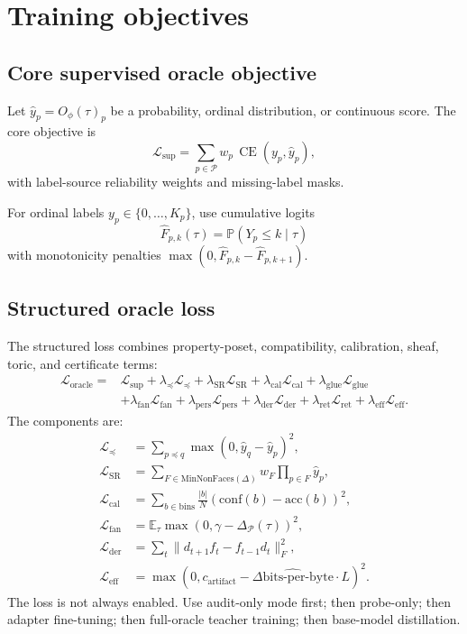 \documentclass[11pt]{article}
\newcommand{\calP}{\mathcal{P}}
\newcommand{\CE}{\operatorname{CE}}
\newcommand{\bitsperbyte}{\mathrm{bits\mbox{-}per\mbox{-}byte}}
\newcommand{\loss}{\mathcal{L}}
\numberwithin{equation}{section}
\begin{document}
\section{Training objectives}
\subsection{Core supervised oracle objective}
Let $\hat y_p=O_\phi(\tau)_p$ be a probability, ordinal distribution, or continuous score. The core objective is
\begin{equation}
\loss_{\mathrm{sup}}=\sum_{p\in\calP}w_p\,\CE(y_p,\hat y_p),
\end{equation}
with label-source reliability weights and missing-label masks.

For ordinal labels $y_p\in\{0,\ldots,K_p\}$, use cumulative logits
\begin{equation}
\hat F_{p,k}(\tau)=\mathbb{P}(Y_p\le k\mid\tau)
\end{equation}
with monotonicity penalties $\max(0,\hat F_{p,k}-\hat F_{p,k+1})$.

\subsection{Structured oracle loss}
The structured loss combines property-poset, compatibility, calibration, sheaf, toric, and certificate terms:
\begin{align}
\loss_{\mathrm{oracle}}={}&\loss_{\mathrm{sup}}+\lambda_{\preceq}\loss_{\preceq}+\lambda_{\mathrm{SR}}\loss_{\mathrm{SR}}+\lambda_{\mathrm{cal}}\loss_{\mathrm{cal}}+\lambda_{\mathrm{glue}}\loss_{\mathrm{glue}}\\
&+\lambda_{\mathrm{fan}}\loss_{\mathrm{fan}}+\lambda_{\mathrm{pers}}\loss_{\mathrm{pers}}+\lambda_{\mathrm{der}}\loss_{\mathrm{der}}+\lambda_{\mathrm{ret}}\loss_{\mathrm{ret}}+\lambda_{\mathrm{eff}}\loss_{\mathrm{eff}}.
\end{align}
The components are:
\begin{align}
\loss_{\preceq}&=\sum_{p\preceq q}\max(0,\hat y_q-\hat y_p)^2,\\
\loss_{\mathrm{SR}}&=\sum_{F\in\mathrm{MinNonFaces}(\Delta)}w_F\prod_{p\in F}\hat y_p,\\
\loss_{\mathrm{cal}}&=\sum_{b\in\mathrm{bins}}\frac{|b|}{N}\left(\mathrm{conf}(b)-\mathrm{acc}(b)\right)^2,\\
\loss_{\mathrm{fan}}&=\mathbb{E}_\tau\max(0,\gamma-\Delta_{\calP}(\tau))^2,\\
\loss_{\mathrm{der}}&=\sum_t\|d_{t+1}f_t-f_{t-1}d_t\|_F^2,\\
\loss_{\mathrm{eff}}&=\max(0, c_{\mathrm{artifact}}-\widehat{\Delta \bitsperbyte}\cdot L)^2.
\end{align}
The loss is not always enabled. Use audit-only mode first; then probe-only; then adapter fine-tuning; then full-oracle teacher training; then base-model distillation.
\end{document}
